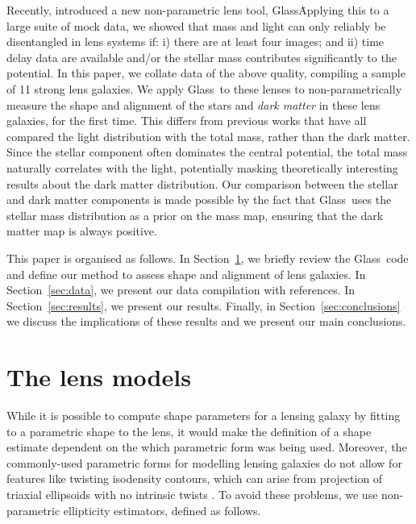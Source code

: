 \documentclass[useAMS,usenatbib]{mn2e}
\def\Glass{{\sc Glass}}
\begin{document}
Recently, \citet{2014MNRAS.445.2181C} introduced a new non-parametric lens tool, \Glass\. Applying this to a large suite of mock data, we showed that mass and light can only reliably be disentangled in lens systems if: i) there are at least four images; and ii) time delay data are available and/or the stellar mass contributes significantly to the potential. In this paper, we collate data of the above quality, compiling a sample of 11 strong lens galaxies. We apply \Glass\ to these lenses to non-parametrically measure the shape and alignment of the stars and {\it dark matter} in these lens galaxies, for the first time. This differs from previous works that have all compared the light distribution with the total mass, rather than the dark matter. Since the stellar component often dominates the central potential, the total mass naturally correlates with the light, potentially masking theoretically interesting results about the dark matter distribution. Our comparison between the stellar and dark matter components is made possible by the fact that \Glass\ uses the stellar mass distribution as a prior on the mass map, ensuring that the dark matter map is always positive.

This paper is organised as follows. In Section~\ref{sec:shapemethod}, we briefly review the \Glass\ code and define our method to assess shape and alignment of lens galaxies. In Section~\ref{sec:data}, we present our data compilation with references. In Section~\ref{sec:results}, we present our results. Finally, in Section~\ref{sec:conclusions} we discuss the implications of these results and we present our main conclusions.


\section{The lens models}\label{sec:shapemethod}

While it is possible to compute shape parameters for a lensing galaxy by fitting to a parametric shape to the lens, it would make the definition of a shape estimate dependent on the which parametric form was being used. Moreover, the commonly-used parametric forms for modelling lensing galaxies \citep[e.g.][]{2001astro.ph..2341K} do not allow for features like twisting isodensity contours, which can arise from projection of triaxial ellipsoids with no intrinsic twists \citep[e.g.][and references therein]{1978ComAp...8...27B}. To avoid these problems, we use non-parametric ellipticity estimators, defined as follows.
\end{document}
